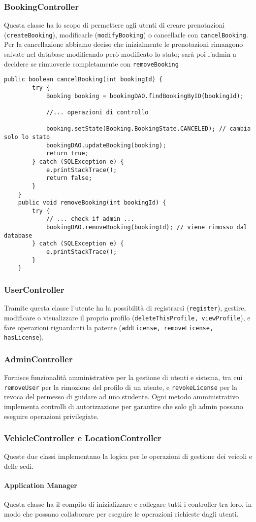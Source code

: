 \subsubsection{BookingController}
Questa classe ha lo scopo di permettere agli utenti di creare prenotazioni (\texttt{createBooking}), modificarle (\texttt{modifyBooking}) o cancellarle con \texttt{cancelBooking}. Per la cancellazione abbiamo deciso che inizialmente le prenotazioni rimangono salvate nel database modificando però modificato lo stato; sarà poi l'admin a decidere se rimuoverle completamente con \texttt{removeBooking}
\begin{lstlisting}[style=Java, caption={Cancellazione e rimozione di una Prenotazione}]
    public boolean cancelBooking(int bookingId) {
        try {
            Booking booking = bookingDAO.findBookingByID(bookingId);
            
            //... operazioni di controllo

            booking.setState(Booking.BookingState.CANCELED); // cambia solo lo stato
            bookingDAO.updateBooking(booking); 
            return true;
        } catch (SQLException e) {
            e.printStackTrace();
            return false;
        }
    }
    public void removeBooking(int bookingId) {
        try {
            // ... check if admin ...
            bookingDAO.removeBooking(bookingId); // viene rimosso dal database
        } catch (SQLException e) {
            e.printStackTrace();
        }
    }
\end{lstlisting}
\subsubsection{UserController}
Tramite questa classe l'utente ha la possibilità di registrarsi (\texttt{register}), gestire, modificare o visualizzare il proprio profilo (\texttt{deleteThisProfile, viewProfile}), e fare operazioni riguardanti la patente (\texttt{addLicense, removeLicense, hasLicense}).
\subsubsection{AdminController}
Fornisce funzionalità amministrative per la gestione di utenti e sistema, tra cui \texttt{removeUser} per la rimozione del profilo di un utente, e \texttt{revokeLicense} per la revoca del permesso di guidare ad uno studente.
Ogni metodo amministrativo implementa controlli di autorizzazione per garantire che solo gli admin possano eseguire operazioni privilegiate.
\subsubsection{VehicleController e LocationController}
Queste due classi implementano la logica per le operazioni di gestione dei veicoli e delle sedi.

\paragraph{Application Manager}
Questa classe ha il compito di inizializzare e collegare tutti i controller tra loro, in modo che possano collaborare per eseguire le operazioni richieste dagli utenti.